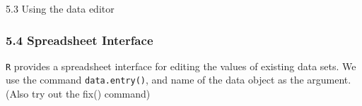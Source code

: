 \documentclass{beamer}
\begin{document}
 	\begin{frame}
 		5.3 Using the data editor
 		
 	\end{frame}
 	\begin{frame}
 		\frametitle{5.4 Spreadsheet Interface}
 		\texttt{R} provides a spreadsheet interface for editing the values of existing data sets. We use the
 		command \texttt{data.entry()}, and name of the data object as the argument. (Also try out the
 		fix() command)
 		
 	\end{frame}
 	
 	
 	
 	
 	
 
\end{document}
